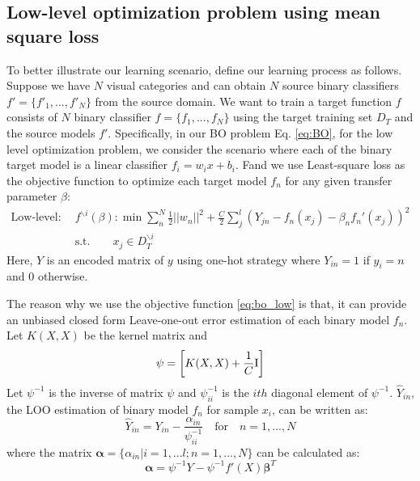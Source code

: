 \subsection{Low-level optimization problem using mean square loss}
To better illustrate our learning scenario, define our learning process as follows. Suppose we have $N$ visual categories and 
can obtain $N$ source binary classifiers $f'=\{f'_1,...,f'_N\}$ from the source domain. We want to train a target function $f$ consists of $N$ binary classifier $f=\{f_1,...,f_N\}$ using the target training set $D_T$ and the source models $f'$.
Specifically, in our BO problem Eq. \eqref{eq:BO}, for the low level optimization problem, we consider the scenario where each of the binary target model is a linear classifier $f_i = w_ix+b_i$.
Fand we use Least-square loss as the objective function to optimize each target model $f_n$ for any given transfer parameter $\beta$:
\begin{equation}\label{eq:bo_low}
\begin{aligned}
\text{Low-level:}\quad&f^{\backslash i}(\beta) : \min \sum_n^N\frac{1}{2}||w_n||^2+\frac{C}{2}\sum_j^l\left(Y_{jn}-f_n(x_j)-\beta_n f_n'(x_j)\right)^2\\
&\text{s.t.} \qquad x_j \in D_T^{\backslash i}
\end{aligned}
\end{equation}
Here, $Y$ is an encoded matrix of $y$ using one-hot strategy where $Y_{in} =1$ if $y_i=n$ and 0 otherwise.

The reason why we use the objective function \eqref{eq:bo_low} is that, it can provide an unbiased closed form Leave-one-out error estimation of each binary model $f_n$\cite{cawley2006leave}. 
Let $K(X,X)$ be the kernel matrix and
\begin{equation}\label{eq:linear}
\psi=\left[ 
{K(X,X) + \frac{1}{C}{\rm{I}}} \right]
\end{equation}
Let $\psi^{-1}$ is the inverse of matrix $\psi$ and  $\psi_{ii}^{-1}$ is the $ith$ diagonal element of $\psi^{-1}$. $\hat{Y}_{in}$, the LOO estimation of binary model $f_n$ for sample $x_i$, can be written as:
\begin{equation} \label{eq:loo}
{\hat Y_{in}} = {Y_{in}} - \frac{{{\alpha _{in}}}}{{\psi_{ii}^{ - 1}}}\quad {\text{for}}\quad n = 1,...,N
\end{equation}
where the matrix $\boldsymbol{\alpha}=\{\alpha_{in}|i=1,...l;n=1,...,N\}$ can be calculated as:
\begin{equation}
\boldsymbol{\alpha} =\psi^{-1} Y - \psi^{-1} f'(X)\boldsymbol{\beta}^T
\end{equation}

